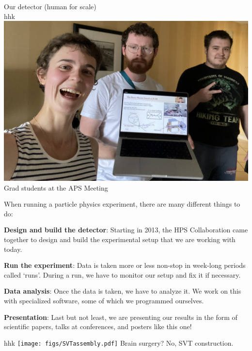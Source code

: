 \begin{poster}
{\begin{minipage}{0.27\columnwidth}
				Our detector (human for scale)\\
				{\color{white} hhk\\}
				\includegraphics[width=\columnwidth]{figs/GradStudents.jpg}
				Grad students at the APS Meeting
			\end{minipage}%
			\hspace{0.01\columnwidth}%
			\begin{minipage}{0.43\columnwidth}
			{When running a particle physics experiment, there are many different things to do:
				\begin{compactitem}
					\item[]
					\item \textbf{Design and build the detector}: Starting in 2013, the HPS Collaboration came together to design and build the experimental setup that we are working with today.
					\item \textbf{Run the experiment}: Data is taken more or less non-stop in week-long periods called `runs'. During a run, we have to monitor our setup and fix it if necessary.
					\item \textbf{Data analysis}: Once the data is taken, we have to analyze it. We work on this with specialized software, some of which we programmed ourselves.
					\item \textbf{Presentation}: Last but not least, we are presenting our results in the form of scientific papers, talks at conferences, and posters like this one!
				\end{compactitem}
			}
			{\color{white} hhk}
			{\centering
			\texttt{[image: figs/SVTassembly.pdf]}
			Brain surgery? No, SVT construction.\\}
			\end{minipage}
}
\end{poster}
